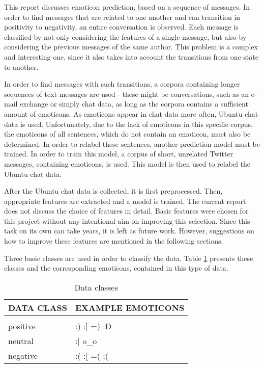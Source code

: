 This report discusses emoticon prediction, based on a sequence of messages. In order to find messages that are related to one another and can transition in positivity to negativity, an entire conversation is observed. Each message is classified by not only considering the features of a single message, but also by considering the previous messages of the same author. This problem is a complex and interesting one, since it also takes into account the transitions from one state to another.

\noindent In order to find messages with such transitions, a corpora containing longer sequences of text messages are used - these might be conversations, such as an e-mail exchange or simply chat data, as long as the corpora contains a sufficient amount of emoticons. As emoticons appear in chat data more often, Ubuntu chat data \cite{ubuntudata} is used. Unfortunately, due to the lack of emoticons in this specific corpus, the emoticons of all sentences, which do not contain an emoticon, must also be determined. In order to relabel these sentences, another prediction model must be trained. In order to train this model, a corpus of short, unrelated Twitter \cite{twittersentiment} messages, containing emoticons, is used. This model is then used to relabel the Ubuntu chat data. 

\noindent After the Ubuntu chat data is collected, it is first preprocessed. Then, appropriate features are extracted and a model is trained. The current report does not discuss the choice of features in detail. Basic features were chosen for this project without any intentional aim on improving this selection. Since this task on its own can take years, it is left as future work. However, suggestions on how to improve these features are mentioned in the following sections.

\noindent Three basic classes are used in order to classify the data. Table \ref{tab:classes} presents these classes and the corresponding emoticons, contained in this type of data.

\begin{table}[h!]
\caption{Data classes}
\label{tab:classes}
\begin{center}
\begin{tabular}{ll}
\multicolumn{1}{l}{\bf DATA CLASS}  &\multicolumn{1}{l}{\bf EXAMPLE EMOTICONS}
\\ \hline \\
positive 			& :) \: \:  			:] \: \: 		=) \: \: 		:D  	\\
neutral 				& :$\vert$ \: \: 	o\_o  								\\
negative 			& :( \: \: 			:[ \: \: 		=( \: \: 		;( 		\\
\end{tabular}{}
\end{center}
\end{table}

